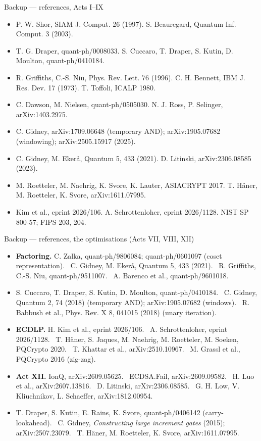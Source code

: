 \documentclass[aspectratio=169,11pt]{beamer}
\begin{document}
\begin{frame}{Backup --- references, Acts I--IX}
  \footnotesize
  \begin{itemize}\setlength{\itemsep}{1.2mm}
    \item P. W. Shor, SIAM J. Comput. 26 (1997). \quad S. Beauregard, Quantum Inf. Comput. 3 (2003).
    \item T. G. Draper, quant-ph/0008033. \quad S. Cuccaro, T. Draper, S. Kutin, D. Moulton, quant-ph/0410184.
    \item R. Griffiths, C.-S. Niu, Phys. Rev. Lett. 76 (1996). \quad C. H. Bennett, IBM J. Res. Dev. 17 (1973). \quad T. Toffoli, ICALP 1980.
    \item C. Dawson, M. Nielsen, quant-ph/0505030. \quad N. J. Ross, P. Selinger, arXiv:1403.2975.
    \item C. Gidney, arXiv:1709.06648 (temporary AND); arXiv:1905.07682 (windowing); arXiv:2505.15917 (2025).
    \item C. Gidney, M. Ekerå, Quantum 5, 433 (2021). \quad D. Litinski, arXiv:2306.08585 (2023).
    \item M. Roetteler, M. Naehrig, K. Svore, K. Lauter, ASIACRYPT 2017. \quad T. Häner, M. Roetteler, K. Svore, arXiv:1611.07995.
    \item Kim et al., eprint 2026/106. \quad A. Schrottenloher, eprint 2026/1128. \quad NIST SP 800-57; FIPS 203, 204.
  \end{itemize}
\end{frame}

\begin{frame}{Backup --- references, the optimisations (Acts VII, VIII, XII)}
  \footnotesize
  \begin{itemize}\setlength{\itemsep}{1.1mm}
    \item \textbf{Factoring.} C. Zalka, quant-ph/9806084; quant-ph/0601097 (coset representation). \ C. Gidney, M. Ekerå, Quantum 5, 433 (2021). \ R. Griffiths, C.-S. Niu, quant-ph/9511007. \ A. Barenco et al., quant-ph/9601018.
    \item S. Cuccaro, T. Draper, S. Kutin, D. Moulton, quant-ph/0410184. \ C. Gidney, Quantum 2, 74 (2018) (temporary AND); arXiv:1905.07682 (windows). \ R. Babbush et al., Phys. Rev. X 8, 041015 (2018) (unary iteration).
    \item \textbf{ECDLP.} H. Kim et al., eprint 2026/106. \ A. Schrottenloher, eprint 2026/1128. \ T. Häner, S. Jaques, M. Naehrig, M. Roetteler, M. Soeken, PQCrypto 2020. \ T. Khattar et al., arXiv:2510.10967. \ M. Grassl et al., PQCrypto 2016 (zig-zag).
    \item \textbf{Act XII.} IonQ, arXiv:2609.05625. \ ECDSA.Fail, arXiv:2609.09582. \ H. Luo et al., arXiv:2607.13816. \ D. Litinski, arXiv:2306.08585. \ G. H. Low, V. Kliuchnikov, L. Schaeffer, arXiv:1812.00954.
    \item T. Draper, S. Kutin, E. Rains, K. Svore, quant-ph/0406142 (carry-lookahead). \ C. Gidney, \emph{Constructing large increment gates} (2015); arXiv:2507.23079. \ T. Häner, M. Roetteler, K. Svore, arXiv:1611.07995.
  \end{itemize}
\end{frame}
\end{document}
